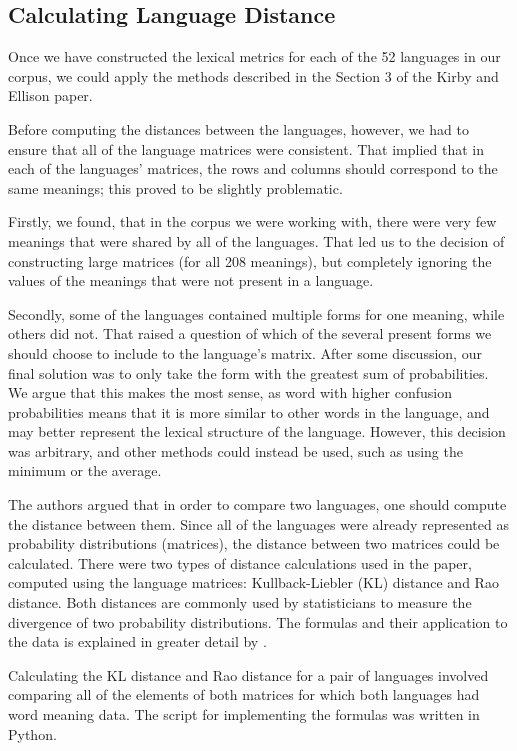 \documentclass[10pt,a4]{article}
\begin{document}
\subsection{Calculating Language Distance}

Once we have constructed the lexical metrics for each of the 52 languages in our corpus, we could apply the methods described in the Section 3 of the Kirby and Ellison paper. 

Before computing the distances between the languages, however, we had to ensure that all of the language matrices were consistent. That implied that in each of the languages’ matrices, the rows and columns should correspond to the same meanings; this proved to be slightly problematic. 

Firstly, we found, that in the corpus we were working with, there were very few meanings that were shared by all of the languages. That led us to the decision of constructing large matrices (for all 208 meanings), but completely ignoring the values of the meanings that were not present in a language. 

Secondly, some of the languages contained multiple forms for one meaning, while others did not. That raised a question of which of the several present forms we should choose to include to the language’s matrix. After some discussion, our final solution was to only take the form with the greatest sum of probabilities.  We argue that this makes the most sense, as word with higher confusion probabilities means that it is more similar to other words in the language, and may better represent the lexical structure of the language.  However, this decision was arbitrary, and other methods could instead be used, such as using the minimum or the average.

The authors argued that in order to compare two languages, one should compute the distance between them. Since all of the languages were already represented as probability distributions (matrices), the distance between two matrices could be calculated. There were two types of distance calculations used in the paper, computed using the language matrices: Kullback-Liebler (KL) distance and Rao distance. Both distances are commonly used by statisticians to measure the divergence of two probability distributions.  The formulas and their application to the data is explained in greater detail by .

Calculating the KL distance and Rao distance for a pair of languages involved comparing all of the elements of both matrices for which both languages had word meaning data. The script for implementing the formulas was written in Python. 
\end{document}

